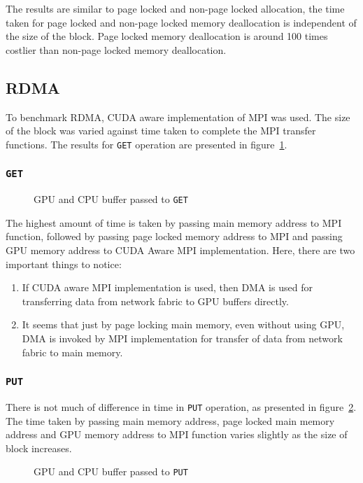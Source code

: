 The results are similar to page locked and non-page locked allocation, the time
taken for page locked and non-page locked memory deallocation is independent of
the size of the block. Page locked memory deallocation is around 100 times costlier
than non-page locked memory deallocation.

\subsection{RDMA}
To benchmark RDMA, CUDA aware implementation of MPI was used. The size of the block
was varied against time taken to complete the MPI transfer functions. The results
for \texttt{GET} operation are presented in figure~\ref{fig:mempin_rdma_get}.

\subsubsection{\texttt{GET}}
\begin{figure}[h]
  
  \caption{GPU and CPU buffer passed to \texttt{GET}}
  \label{fig:mempin_rdma_get}
\end{figure}


The highest amount of time is taken by passing main memory address to MPI function,
followed by passing page locked memory address to MPI and passing GPU memory
address to CUDA Aware MPI implementation. Here, there are two important things to
notice:
\begin{enumerate}
\item If CUDA aware MPI implementation is used, then DMA is used for transferring
  data from network fabric to GPU buffers directly.
\item It seems that just by page locking main memory, even without using GPU, DMA
  is invoked by MPI implementation for transfer of data from network fabric to
  main memory.
\end{enumerate}

\subsubsection{\texttt{PUT}}
There is not much of difference in time in \texttt{PUT} operation, as presented
in figure~\ref{fig:mempin_rdma_put}. The time taken by passing main memory address,
page locked main memory address and GPU memory address to MPI function varies slightly
as the size of block increases.

\begin{figure}[h]
  
  \caption{GPU and CPU buffer passed to \texttt{PUT}}
  \label{fig:mempin_rdma_put}
\end{figure}


